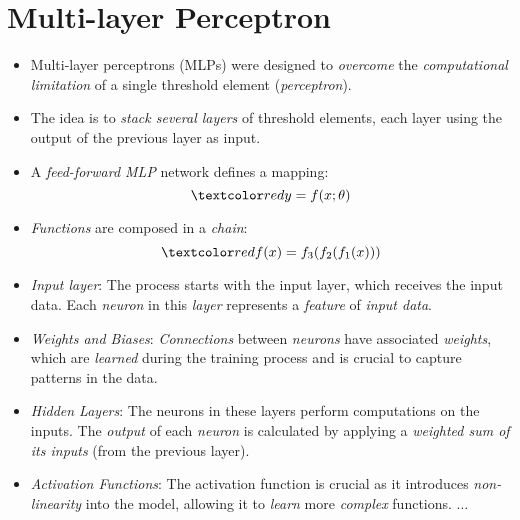 \documentclass[
	number={8},
	title={Artificial Neural Network}
]{cs584notes}
\begin{document}
\section{Multi-layer Perceptron}\label{sec:multi-layer-perceptron}
\begin{itemize}
	\item Multi-layer perceptrons (MLPs) were designed to \emph{overcome} the \emph{computational limitation} of a single threshold element (\emph{perceptron}).
	\item The idea is to \emph{stack several layers} of threshold elements, each layer using the output of the previous layer as input.
	\item A \emph{feed-forward MLP} network defines a mapping:
	\[\data{ y = f(x; \theta) }\]
	\item \emph{Functions} are composed in a \emph{chain}:
	\[\data{ f(x) = f_{3}(f_{2}(f_{1}(x))) }\]
	\item \emph{Input layer}: The process starts with the input layer, which receives the input data.
	Each \emph{neuron} in this \emph{layer} represents a \emph{feature} of \emph{input data}.
	\item \emph{Weights and Biases}: \emph{Connections} between \emph{neurons} have associated \emph{weights}, which are \emph{learned} during the training process and is crucial to capture patterns in the data.
	\item \emph{Hidden Layers}: The neurons in these layers perform computations on the inputs.
	The \emph{output} of each \emph{neuron} is calculated by applying a \emph{weighted sum of its inputs} (from the previous layer).
	\item \emph{Activation Functions}: The activation function is crucial as it introduces \emph{non-linearity} into the model, allowing it to \emph{learn} more \emph{complex} functions. $\dots$
\end{itemize}
\end{document}
